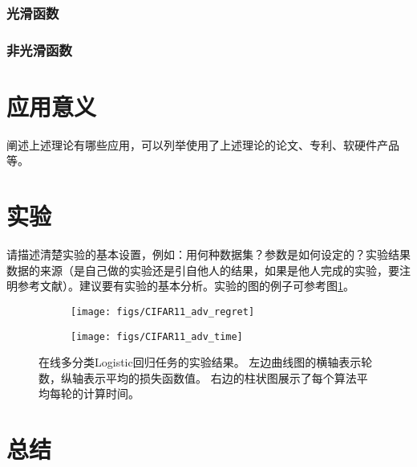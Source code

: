 \documentclass[a4paper,twoside,AutoFakeBold]{article}
\theoremstyle{definition}
\begin{document}
\subsubsection{光滑函数}
\lipsum[34]
\subsubsection{非光滑函数}
\lipsum[35]

%
\section{应用意义}\label{section:application}
阐述上述理论有哪些应用，可以列举使用了上述理论的论文、专利、软硬件产品等。

\lipsum[16-24]

%
\section{实验}\label{section:experiment}
请描述清楚实验的基本设置，例如：用何种数据集？参数是如何设定的？实验结果数据的来源（是自己做的实验还是引自他人的结果，如果是他人完成的实验，要注明参考文献）。建议要有实验的基本分析。实验的图的例子可参考图\ref{figure_LR_curves}。

\lipsum[25-26]
\begin{figure}[ht]
	\begin{subfigure}{.48\textwidth}
		\centering
		\texttt{[image: figs/CIFAR11\_adv\_regret]}
	\end{subfigure}
	\hfill
	\begin{subfigure}{.48\textwidth}
		\centering
		\texttt{[image: figs/CIFAR11\_adv\_time]}
	\end{subfigure}
	\caption[在线多分类Logistic回归任务的实验结果]{
		在线多分类Logistic回归任务的实验结果。
		左边曲线图的横轴表示轮数，纵轴表示平均的损失函数值。
		右边的柱状图展示了每个算法平均每轮的计算时间。
	}
	\label{figure_LR_curves}
\end{figure}
\lipsum[27]

%
\section{总结}\label{section:conclusion}
\lipsum[28]





\end{document}
